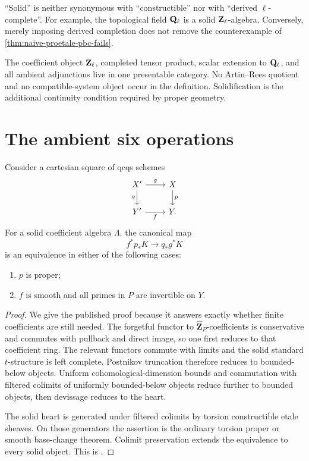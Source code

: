\begin{warning}
``Solid'' is neither synonymous with ``constructible'' nor with ``derived
\(\ell\)-complete''.  For example, the topological field \(\mathbf Q_\ell\) is a solid
\(\mathbf Z_\ell\)-algebra.  Conversely, merely imposing derived completion does not
remove the counterexample of \cref{thm:naive-proetale-pbc-fails}.
\end{warning}

\begin{proetalebox}[title={What Route B gains}]
The coefficient object \(\mathbf Z_\ell\), completed tensor product, scalar extension
to \(\mathbf Q_\ell\), and all ambient adjunctions live in one presentable category.
No Artin--Rees quotient and no compatible-system object occur in the
definition.  Solidification is the additional continuity condition required
by proper geometry.
\end{proetalebox}

\section{The ambient six operations}

\begin{theorem}
\label{thm:solid-ambient-base-change}
Consider a cartesian square of qcqs schemes
\begin{equation}
\label{eq:solid-base-change-square}
\begin{tikzcd}
X' \arrow[r,"g"] \arrow[d,"q"'] & X \arrow[d,"p"] \\
Y' \arrow[r,"f"'] & Y.
\end{tikzcd}
\end{equation}
For a solid coefficient algebra \(\Lambda\), the canonical map
\[
 f^*p_*K\longrightarrow q_*g^*K
\]
is an equivalence in either of the following cases:
\begin{enumerate}
\item \(p\) is proper;
\item \(f\) is smooth and all primes in \(P\) are invertible on \(Y\).
\end{enumerate}
\end{theorem}

\begin{proof}
We give the published proof because it answers exactly whether finite
coefficients are still needed.  The forgetful functor to
\(\widehat{\mathbf Z}_{P}\)-coefficients is conservative and commutes with
pullback and direct image, so one first reduces to that coefficient ring.
The relevant functors commute with limits and the solid standard
\(t\)-structure is left complete.  Postnikov truncation therefore reduces
to bounded-below objects.  Uniform cohomological-dimension bounds and
commutation with filtered colimits of uniformly bounded-below objects reduce
further to bounded objects, then devissage reduces to the heart.

The solid heart is generated under filtered colimits by torsion
constructible etale sheaves.  On those generators the assertion is the
ordinary torsion proper or smooth base-change theorem.  Colimit preservation
extends the equivalence to every solid object.  This is
\cite[Proposition~1.3.6]{RuimyTubachWolfSolid}.
\end{proof}

